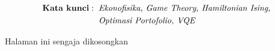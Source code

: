 \begin{minipage}{1cm}
	\begin{align*}
	\text{\textbf{Kata kunci}}:\hspace{2mm}&\text{\textit{Ekonofisika, Game Theory, Hamiltonian Ising,}} \\
	&\text{\textit{Optimasi Portofolio, VQE}}
	\end{align*}
\end{minipage}

\newpage
\thispagestyle{empty}
\vspace*{\fill}
    \begin{center}
	Halaman ini sengaja dikosongkan
    \end{center}
\vspace*{\fill}
\pagebreak
